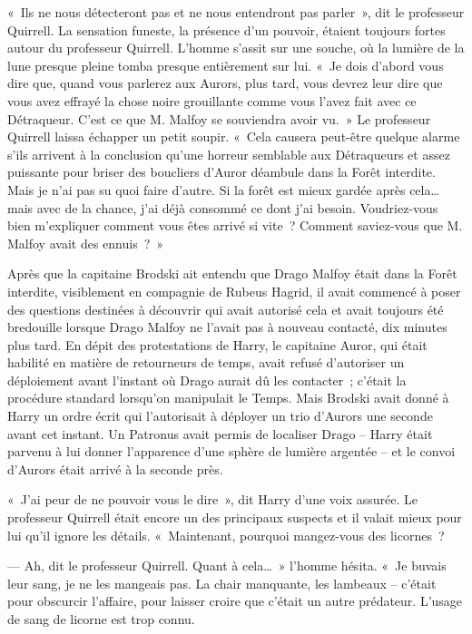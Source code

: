 «~Ils ne nous détecteront pas et ne nous entendront pas parler~», dit le professeur Quirrell.
La sensation funeste, la présence d'un pouvoir, étaient toujours fortes autour du professeur Quirrell.
L'homme s'assit sur une souche, où la lumière de la lune presque pleine tomba presque entièrement sur lui.
«~Je dois d'abord vous dire que, quand vous parlerez aux Aurors, plus tard, vous devrez leur dire que vous avez effrayé la chose noire grouillante comme vous l'avez fait avec ce Détraqueur.
C'est ce que M. Malfoy se souviendra avoir vu.~»
Le professeur Quirrell laissa échapper un petit soupir.
«~Cela causera peut-être quelque alarme s'ils arrivent à la conclusion qu'une horreur semblable aux Détraqueurs et assez puissante pour briser des boucliers d'Auror déambule dans la Forêt interdite.
Mais je n'ai pas su quoi faire d'autre.
Si la forêt est mieux gardée après cela… mais avec de la chance, j'ai déjà consommé ce dont j'ai besoin.
Voudriez-vous bien m'expliquer comment vous êtes arrivé si vite~?
Comment saviez-vous que M. Malfoy avait des ennuis~?~»

Après que la capitaine Brodski ait entendu que Drago Malfoy était dans la Forêt interdite, visiblement en compagnie de Rubeus Hagrid, il avait commencé à poser des questions destinées à découvrir qui avait autorisé cela et avait toujours été bredouille lorsque Drago Malfoy ne l'avait pas à nouveau contacté, dix minutes plus tard.
En dépit des protestations de Harry, le capitaine Auror, qui était habilité en matière de retourneurs de temps, avait refusé d'autoriser un déploiement avant l'instant où Drago aurait dû les contacter~; c'était la procédure standard lorsqu'on manipulait le Temps.
Mais Brodski avait donné à Harry un ordre écrit qui l'autorisait à déployer un trio d'Aurors une seconde avant cet instant.
Un Patronus avait permis de localiser Drago -- Harry était parvenu à lui donner l'apparence d'une sphère de lumière argentée -- et le convoi d'Aurors était arrivé à la seconde près.

«~J'ai peur de ne pouvoir vous le dire~», dit Harry d'une voix assurée.
Le professeur Quirrell était encore un des principaux suspects et il valait mieux pour lui qu'il ignore les détails.
«~Maintenant, pourquoi mangez-vous des licornes~?

--- Ah, dit le professeur Quirrell.
Quant à cela…~»
l'homme hésita.
«~Je buvais leur sang, je ne les mangeais pas.
La chair manquante, les lambeaux -- c'était pour obscurcir l'affaire, pour laisser croire que c'était un autre prédateur.
L'usage de sang de licorne est trop connu.

